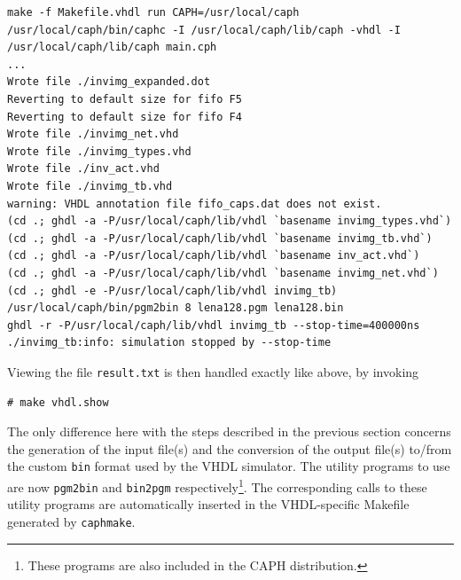 \begin{lstlisting}[style=BashOutputStyle]
make -f Makefile.vhdl run CAPH=/usr/local/caph
/usr/local/caph/bin/caphc -I /usr/local/caph/lib/caph -vhdl -I /usr/local/caph/lib/caph main.cph
...
Wrote file ./invimg_expanded.dot
Reverting to default size for fifo F5
Reverting to default size for fifo F4
Wrote file ./invimg_net.vhd
Wrote file ./invimg_types.vhd
Wrote file ./inv_act.vhd
Wrote file ./invimg_tb.vhd
warning: VHDL annotation file fifo_caps.dat does not exist.
(cd .; ghdl -a -P/usr/local/caph/lib/vhdl `basename invimg_types.vhd`)
(cd .; ghdl -a -P/usr/local/caph/lib/vhdl `basename invimg_tb.vhd`)
(cd .; ghdl -a -P/usr/local/caph/lib/vhdl `basename inv_act.vhd`)
(cd .; ghdl -a -P/usr/local/caph/lib/vhdl `basename invimg_net.vhd`)
(cd .; ghdl -e -P/usr/local/caph/lib/vhdl invimg_tb)
/usr/local/caph/bin/pgm2bin 8 lena128.pgm lena128.bin
ghdl -r -P/usr/local/caph/lib/vhdl invimg_tb --stop-time=400000ns  
./invimg_tb:info: simulation stopped by --stop-time
\end{lstlisting}

Viewing the file \verb|result.txt| is then handled exactly like above, by invoking 

\begin{lstlisting}[style=BashInputStyle]
# make vhdl.show
\end{lstlisting}

The only difference here with the steps described in the previous section concerns the
generation of the input file(s) and the conversion of the output file(s) to/from the custom
\verb|bin| format used by the VHDL simulator. The utility programs to use are now \verb|pgm2bin| and
\verb|bin2pgm| respectively\footnote{These programs are also included in the CAPH
  distribution.}. The corresponding calls to these utility programs are automatically inserted in
the VHDL-specific Makefile generated by \verb|caphmake|.


